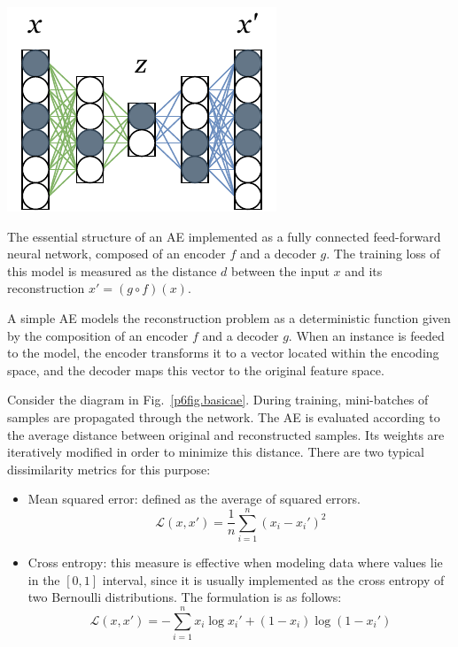 \begin{marginfigure}
  \centering
  \includegraphics[width=\linewidth]{basic-fc-ae.pdf}
  \caption[The essential structure of an AE implemented as a fully connected feed-forward neural network.]{\label{p6fig.basicae}The essential structure of an AE implemented as a fully connected feed-forward neural network, composed of an encoder $f$ and a decoder $g$. The training loss of this model is measured as the distance $d$ between the input $x$ and its reconstruction $x'=(g\circ f)(x)$.}
\end{marginfigure}

A simple AE models the reconstruction problem as a deterministic function given by the composition of an encoder $f$ and a decoder $g$. When an instance is feeded to the model, the encoder transforms it to a vector located within the encoding space, and the decoder maps this vector to the original feature space.

Consider the diagram in Fig.~\ref{p6fig.basicae}. During training, mini-batches of samples are propagated through the network. The AE is evaluated according to the average distance between original and reconstructed samples. Its weights are iteratively modified in order to minimize this distance. There are two typical dissimilarity metrics for this purpose:

\begin{itemize}
  \item Mean squared error: defined as the average of squared errors.  \begin{equation}\mathcal L(x,x')=\frac 1 n \sum_{i=1}^n(x_i - x_i')^2\end{equation}
  \item Cross entropy: this measure is effective when modeling data where values lie in the $[0,1]$ interval, since it is usually implemented as the cross entropy of two Bernoulli distributions. The formulation is as follows: \begin{equation}\mathcal L(x,x')= -\sum_{i=1}^n x_i\log x_i'  + (1-x_i)\log(1-x_i') \end{equation}
\end{itemize}

